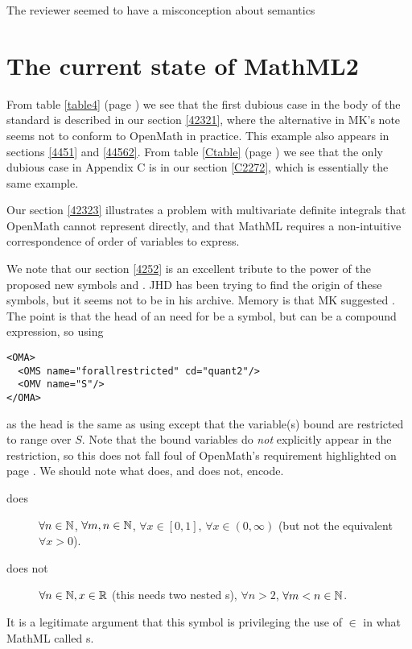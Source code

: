 \documentclass{llncs}
\begin{document}
\begin{newpart}{The reviewer seemed to have a misconception about semantics}
\section{The current state of MathML2}
From table \ref{table4} (page \pageref{table4}) we see that the first dubious
case in the body of the standard is described in our section \ref{42321},
where the alternative in MK's note \cite{Kohlhase2008} seems not to conform to OpenMath
in practice. This example also appears in sections \ref{4451} and \ref{44562}.
From table \ref{Ctable} (page \pageref{Ctable}) we see that the only dubious
case in Appendix C is in our section \ref{C2272}, which is essentially the same
example.
\par
Our section \ref{42323} illustrates a problem with multivariate definite
integrals that OpenMath cannot represent directly, and that MathML requires a
non-intuitive correspondence of order of variables to express.
\par
We note that our section \ref{4252} is an excellent tribute to the power of the
proposed new symbols {} and {}. JHD
has been trying to find the origin of these symbols, but it seems not to be in
his archive. Memory is that MK suggested {}. The point is
that the head of an {} need for be a symbol, but can be a compound
expression, so using 
\begin{lstlisting}
<OMA>
  <OMS name="forallrestricted" cd="quant2"/>
  <OMV name="S"/>
</OMA>
\end{lstlisting}
as the head is the same as using {}
except that the variable(s) bound are restricted to range over $S$. Note that
the bound variables do {\emph{not}} explicitly appear in the restriction, so
this does not fall foul of OpenMath's requirement highlighted on page
\pageref{OMbound}.
We should note what {} does, and does not, encode.
\begin{description}
\item[does]$\forall n\in\mathbb{N}$, $\forall m,n\in\mathbb{N}$, $\forall x\in[0,1]$, $\forall
x\in(0,\infty)$ (but not the equivalent $\forall x>0$).
\item[does not]$\forall n\in\mathbb{N},x \in\mathbb{R}$ (this needs two nested
{}s), $\forall n>2$, $\forall m<n\in\mathbb{N}$.
\end{description}
It is a legitimate argument that this {} symbol is
privileging the use of $\in$ in what MathML called {}s.
\fi
\iffull

\end{newpart}
\end{document}

